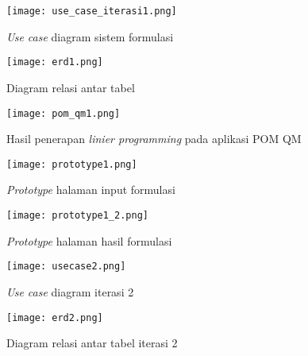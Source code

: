 \begin{figure}[h!] %
	\centering
	\texttt{[image: use\_case\_iterasi1.png]}
	\caption{\textit{Use case} diagram sistem formulasi}
	\label{fig:usecase1}
\end{figure}

\begin{figure}[h!] %
	\centering
	\texttt{[image: erd1.png]}
	\caption{Diagram relasi antar tabel}
	\label{fig:erd1}
\end{figure}

\begin{figure}[h!] %
	\centering
	\texttt{[image: pom\_qm1.png]}
	\caption{Hasil penerapan \textit{linier programming} pada aplikasi POM QM}
	\label{fig:pomqm1}
\end{figure}

\begin{figure}[h!] %
\centering
\texttt{[image: prototype1.png]}
\caption{\textit{Prototype} halaman input formulasi}
\label{fig:pt1_1}
\end{figure}

\begin{figure}[h!] %
\centering
\texttt{[image: prototype1\_2.png]}
\caption{\textit{Prototype} halaman hasil formulasi}
\label{fig:pt1_2}
\end{figure}

\begin{figure}[h!] %
	\centering
	\texttt{[image: usecase2.png]}
	\caption{\textit{Use case} diagram iterasi 2}
	\label{fig:usecase1}
\end{figure}

\begin{figure}[h!] %
	\centering
	\texttt{[image: erd2.png]}
	\caption{Diagram relasi antar tabel iterasi 2}
	\label{fig:erd1}
\end{figure}

